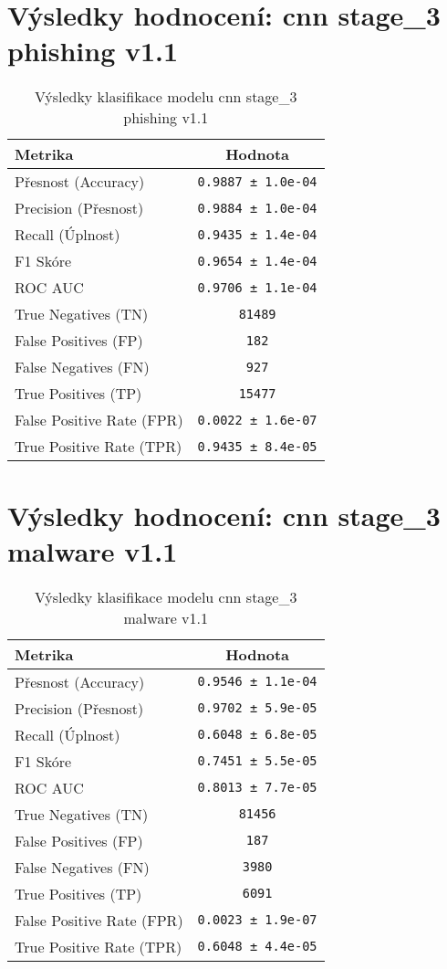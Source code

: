 \section*{Výsledky hodnocení: cnn stage_3 phishing v1.1}
\begin{table}[h!]
\centering
\begin{tabular}{|l|c|}
\hline
\textbf{Metrika} & \textbf{Hodnota} \\
\hline
Přesnost (Accuracy) & \texttt{0.9887 ± 1.0e-04} \\
Precision (Přesnost) & \texttt{0.9884 ± 1.0e-04} \\
Recall (Úplnost) & \texttt{0.9435 ± 1.4e-04} \\
F1 Skóre & \texttt{0.9654 ± 1.4e-04} \\
ROC AUC & \texttt{0.9706 ± 1.1e-04} \\
True Negatives (TN) & \texttt{81489} \\
False Positives (FP) & \texttt{182} \\
False Negatives (FN) & \texttt{927} \\
True Positives (TP) & \texttt{15477} \\
False Positive Rate (FPR) & \texttt{0.0022 ± 1.6e-07} \\
True Positive Rate (TPR) & \texttt{0.9435 ± 8.4e-05} \\
\hline
\end{tabular}
\caption{Výsledky klasifikace modelu cnn stage_3 phishing v1.1}
\label{tab:phishing_cnn}
\end{table}

\section*{Výsledky hodnocení: cnn stage_3 malware v1.1}
\begin{table}[h!]
\centering
\begin{tabular}{|l|c|}
\hline
\textbf{Metrika} & \textbf{Hodnota} \\
\hline
Přesnost (Accuracy) & \texttt{0.9546 ± 1.1e-04} \\
Precision (Přesnost) & \texttt{0.9702 ± 5.9e-05} \\
Recall (Úplnost) & \texttt{0.6048 ± 6.8e-05} \\
F1 Skóre & \texttt{0.7451 ± 5.5e-05} \\
ROC AUC & \texttt{0.8013 ± 7.7e-05} \\
True Negatives (TN) & \texttt{81456} \\
False Positives (FP) & \texttt{187} \\
False Negatives (FN) & \texttt{3980} \\
True Positives (TP) & \texttt{6091} \\
False Positive Rate (FPR) & \texttt{0.0023 ± 1.9e-07} \\
True Positive Rate (TPR) & \texttt{0.6048 ± 4.4e-05} \\
\hline
\end{tabular}
\caption{Výsledky klasifikace modelu cnn stage_3 malware v1.1}
\label{tab:malware_cnn}
\end{table}

